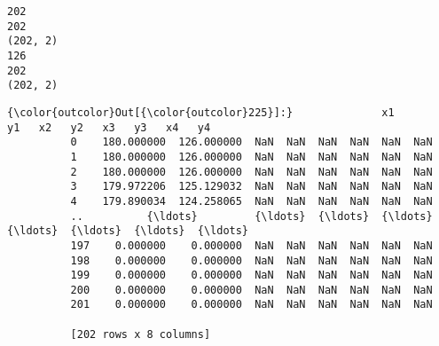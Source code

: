 \documentclass[11pt]{article}
\begin{document}
    \begin{Verbatim}[commandchars=\\\{\}]
202
202
(202, 2)
126
202
(202, 2)

    \end{Verbatim}

\begin{Verbatim}[commandchars=\\\{\}]
{\color{outcolor}Out[{\color{outcolor}225}]:}              x1          y1   x2   y2   x3   y3   x4   y4
          0    180.000000  126.000000  NaN  NaN  NaN  NaN  NaN  NaN
          1    180.000000  126.000000  NaN  NaN  NaN  NaN  NaN  NaN
          2    180.000000  126.000000  NaN  NaN  NaN  NaN  NaN  NaN
          3    179.972206  125.129032  NaN  NaN  NaN  NaN  NaN  NaN
          4    179.890034  124.258065  NaN  NaN  NaN  NaN  NaN  NaN
          ..          {\ldots}         {\ldots}  {\ldots}  {\ldots}  {\ldots}  {\ldots}  {\ldots}  {\ldots}
          197    0.000000    0.000000  NaN  NaN  NaN  NaN  NaN  NaN
          198    0.000000    0.000000  NaN  NaN  NaN  NaN  NaN  NaN
          199    0.000000    0.000000  NaN  NaN  NaN  NaN  NaN  NaN
          200    0.000000    0.000000  NaN  NaN  NaN  NaN  NaN  NaN
          201    0.000000    0.000000  NaN  NaN  NaN  NaN  NaN  NaN
          
          [202 rows x 8 columns]
\end{Verbatim}
            
\end{document}
